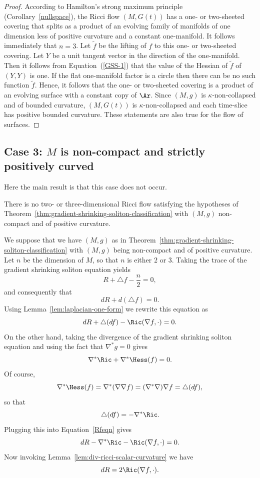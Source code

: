 \begin{proof}
According to Hamilton's strong maximum principle
(Corollary~\ref{nullspace}), the Ricci flow $(M,G(t))$ has a one- or
two-sheeted covering that splits as a product of an evolving family
of manifolds of one dimension less of positive curvature and a
constant one-manifold.  It follows immediately that $n=3$.
 Let
$\tilde f$ be the lifting of $f$ to this one- or two-sheeted
covering. Let $Y$ be a unit tangent vector in the direction of the
one-manifold. Then it follows from Equation~(\ref{GSS-1}) that the
value of the Hessian of $\tilde f$ of $(Y,Y)$ is one. If the flat
one-manifold factor is a circle then there can be no such function
$\tilde f$. Hence, it follows that the one- or two-sheeted covering
is a product of an evolving surface with a constant copy of $\Ar$.
 Since
$(M,g)$ is $\kappa$-non-collapsed and of bounded curvature,
$(M,G(t))$ is $\kappa$-non-collapsed and each time-slice has
positive bounded curvature. These statements are also true for the
flow of surfaces.
\end{proof}




\subsection{Case 3: $M$ is non-compact and
strictly positively curved}\label{noncomp}

Here the main result is that this case does not occur.

\begin{proposition}\label{prop:no-noncompact-positive-curvature-soliton}
\label{noncompsol}
There is no  two- or three-dimensional  Ricci flow satisfying the hypotheses of
Theorem~\ref{thm:gradient-shrinking-soliton-classification} with $(M,g)$ non-compact and of positive curvature.
\end{proposition}

We suppose that we have $(M,g)$ as in Theorem~\ref{thm:gradient-shrinking-soliton-classification} with
$(M,g)$ being non-compact and of positive curvature. Let $n$ be the
dimension of $M$, so that $n$ is either $2$ or $3$. Taking the trace
of the gradient shrinking soliton equation yields
$$R+\triangle f-\frac{n}{2}=0,$$
and consequently that $$ dR+d(\triangle f)=0.$$ Using
Lemma~\ref{lem:laplacian-one-form} we rewrite this equation as
\begin{equation}\label{Rfeqn}
dR+\triangle(df)-\Ric(\nabla f,\cdot)=0.\end{equation}
 On the other
hand, taking the divergence of the gradient shrinking soliton
equation and using the fact that $\nabla^* g=0$ gives
$$\nabla^*\Ric+\nabla^*\Hess(f)=0.$$
Of course, $$\nabla^*\Hess(f)=\nabla^*(\nabla\nabla
f)=(\nabla^*\nabla)\nabla f=\triangle (df),$$ so that
$$\triangle(df)=-\nabla^*\Ric.$$ Plugging this into Equation~\ref{Rfeqn}
 gives
$$dR-\nabla^*\Ric-\Ric(\nabla f,\cdot)=0.$$
Now invoking Lemma~\ref{lem:div-ricci-scalar-curvature} we have  \begin{equation}\label{dR}
dR=2\Ric(\nabla f,\cdot).\end{equation}

